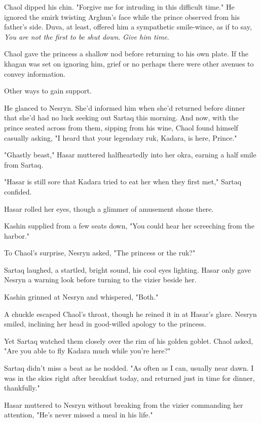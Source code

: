 Chaol dipped his chin. "Forgive me for intruding in this difficult time." He ignored the smirk twisting Arghun's face while the prince observed from his father's side. Duva, at least, offered him a sympathetic smile-wince, as if to say, \emph{You are not the first to be shut down}. \emph{Give him time}.

Chaol gave the princess a shallow nod before returning to his own plate. If the khagan was set on ignoring him, grief or no  perhaps there were other avenues to convey information.

Other ways to gain support.

He glanced to Nesryn. She'd informed him when she'd returned before dinner that she'd had no luck seeking out Sartaq this morning. And now, with the prince seated across from them, sipping from his wine, Chaol found himself casually asking, "I heard that your legendary ruk, Kadara, is here, Prince."

"Ghastly beast," Hasar muttered halfheartedly into her okra, earning a half smile from Sartaq.

"Hasar is still sore that Kadara tried to eat her when they first met," Sartaq confided.

Hasar rolled her eyes, though a glimmer of amusement shone there.

Kashin supplied from a few seats down, "You could hear her screeching from the harbor."

To Chaol's surprise, Nesryn asked, "The princess or the ruk?"

Sartaq laughed, a startled, bright sound, his cool eyes lighting. Hasar only gave Nesryn a warning look before turning to the vizier beside her.

Kashin grinned at Nesryn and whispered, "Both."

A chuckle escaped Chaol's throat, though he reined it in at Hasar's glare. Nesryn smiled, inclining her head in good-willed apology to the princess.

Yet Sartaq watched them closely over the rim of his golden goblet. Chaol asked, "Are you able to fly Kadara much while you're here?"

Sartaq didn't miss a beat as he nodded. "As often as I can, usually near dawn. I was in the skies right after breakfast today, and returned just in time for dinner, thankfully."

Hasar muttered to Nesryn without breaking from the vizier commanding her attention, "He's never missed a meal in his life."

